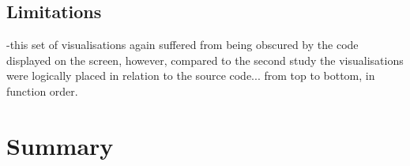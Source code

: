 \subsection{Limitations}

-this set of visualisations again suffered from being obscured by the code displayed on the screen, however, compared to the second study the visualisations were logically placed in relation to the source code... from top to bottom, in function order.


\section{Summary}










